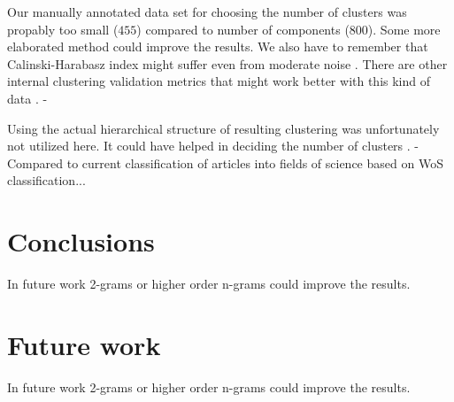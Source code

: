 Our manually annotated data set for choosing the number of clusters
was propably too small ($455$) compared to number of components 
($800$). Some more elaborated method could improve the results. 
We also have to remember that Calinski-Harabasz index might suffer
even from moderate noise \cite{liu_understanding_2010}.
There are other internal clustering validation metrics that might 
work better with this kind of data \cite{liu_understanding_2010}.
- 

Using the actual hierarchical structure of resulting clustering 
was unfortunately not utilized here. It could have helped in 
deciding the number of clusters \cite{kimes_statistical_2017}.
- Compared to current classification of articles into fields of 
science based on WoS classification...





\section*{Conclusions}
\label{sec:conclusions}
In future work 2-grams or higher order n-grams could improve the 
results.


\section*{Future work}
\label{sec:future}
In future work 2-grams or higher order n-grams could improve the 
results.
